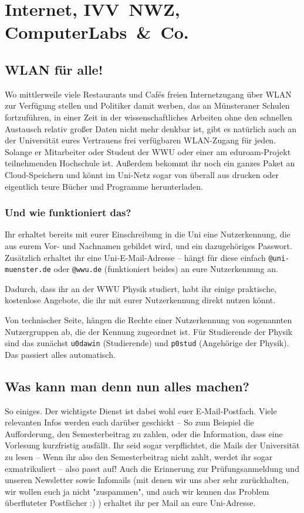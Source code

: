 \section{Internet, IVV~NWZ, Computer\-Labs~\&~Co.}
\begin{multicols*}{2}
\subsection{WLAN für alle!}
Wo mittlerweile viele Restaurants und Cafés freien Internetzugang über WLAN zur Verfügung stellen und Politiker damit werben, das an Münsteraner Schulen fortzuführen, in einer Zeit in der wissenschaftliches Arbeiten ohne den schnellen Austausch relativ großer Daten nicht mehr denkbar ist, gibt es natürlich auch an der Universität eures Vertrauens frei verfügbaren WLAN-Zugang für jeden. Solange er Mitarbeiter oder Student der WWU oder einer am eduroam-Projekt teilnehmenden Hochschule ist.
Außerdem bekommt ihr noch ein ganzes Paket an Cloud-Speichern und könnt im Uni-Netz sogar von überall aus drucken oder eigentlich teure Bücher und Programme herunterladen.

\subsubsection{Und wie funktioniert das?}
Ihr erhaltet bereits mit eurer Einschreibung in die Uni eine Nutzerkennung, die aus eurem Vor- und Nachnamen gebildet wird, und ein dazugehöriges Passwort.
Zusätzlich erhaltet ihr eine Uni-E-Mail-Adresse -- hängt für diese einfach \texttt{@uni-muenster.de} oder \texttt{@wwu.de} (funktioniert beides) an eure Nutzerkennung an.

Dadurch, dass ihr an der WWU Physik studiert, habt ihr einige praktische, kostenlose Angebote, die ihr mit eurer Nutzerkennung direkt nutzen könnt.

Von technischer Seite, hängen die Rechte einer Nutzerkennung von sogenannten Nutzergruppen ab, die der Kennung zugeordnet ist. Für Studierende der Physik sind das zunächst \texttt{u0dawin} (Studierende) und \texttt{p0stud} (Angehörige der Physik). Das passiert alles automatisch.

\subsection{Was kann man denn nun alles machen?}
So einiges. Der wichtigste Dienst ist dabei wohl euer E-Mail-Postfach.
Viele relevanten Infos werden euch darüber geschickt -- So zum Beispiel die Aufforderung, den Semesterbeitrag zu zahlen, oder die Information, dass eine Vorlesung kurzfristig ausfällt.
Ihr seid sogar verpflichtet, die Mails der Universität zu lesen -- Wenn ihr also den Semesterbeitrag nicht zahlt, werdet ihr sogar exmatrikuliert -- also passt auf! Auch die Erinnerung zur Prüfungsanmeldung und unseren Newsletter sowie Infomails (mit denen wir uns aber sehr zurückhalten, wir wollen euch ja nicht "zuspammen", und auch wir kennen das Problem überfluteter Postfächer :) ) erhaltet ihr per Mail an eure Uni-Adresse.


\end{multicols*}
